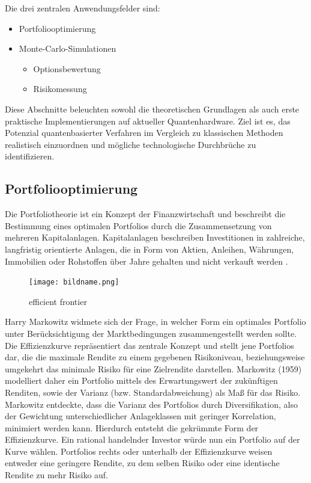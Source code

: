 Die drei zentralen Anwendungsfelder sind:

\begin{itemize}
    \item{Portfoliooptimierung}
   
    \item{Monte-Carlo-Simulationen}

    \begin{itemize}
        \item{Optionsbewertung}
        \item{Risikomessung}
    \end{itemize}
\end{itemize}

Diese Abschnitte beleuchten sowohl die theoretischen Grundlagen als auch erste praktische Implementierungen auf aktueller Quantenhardware. Ziel ist es, das Potenzial quantenbasierter Verfahren im Vergleich zu klassischen Methoden realistisch einzuordnen und mögliche technologische Durchbrüche zu identifizieren.

\subsection{Portfoliooptimierung}
Die Portfoliotheorie ist ein Konzept der Finanzwirtschaft und beschreibt die Bestimmung eines optimalen Portfolios durch die Zusammensetzung von mehreren Kapitalanlagen. Kapitalanlagen beschreiben Investitionen in zahlreiche, langfristig orientierte Anlagen, die in Form von Aktien, Anleihen, Währungen, Immobilien oder Rohstoffen über Jahre gehalten und nicht verkauft werden \cite{orus_quantum_2019, sakuler_real-world_2025}.

\begin{figure}[h]
  \centering
  \texttt{[image: bildname.png]}
  \caption{efficient frontier}
  \label{fig:beispielbild}
\end{figure}

Harry Markowitz widmete sich der Frage, in welcher Form ein optimales Portfolio unter Berücksichtigung der Marktbedingungen zusammengestellt werden sollte. Die Effizienzkurve repräsentiert das zentrale Konzept und stellt jene Portfolios dar, die die maximale Rendite zu einem gegebenen Risikoniveau, beziehungsweise umgekehrt das minimale Risiko für eine Zielrendite darstellen. Markowitz (1959) modelliert daher ein Portfolio mittels des Erwartungswert der zukünftigen Renditen, sowie der Varianz (bzw. Standardabweichung) als Maß für das Risiko. Markowitz entdeckte, dass die Varianz des Portfolios durch Diversifikation, also der Gewichtung unterschiedlicher Anlageklassen mit geringer Korrelation, minimiert werden kann. Hierdurch entsteht die gekrümmte Form der Effizienzkurve. Ein rational handelnder Investor würde nun ein Portfolio auf der Kurve wählen. Portfolios rechts oder unterhalb der Effizienzkurve weisen entweder eine geringere Rendite, zu dem selben Risiko oder eine identische Rendite zu mehr Risiko auf.


